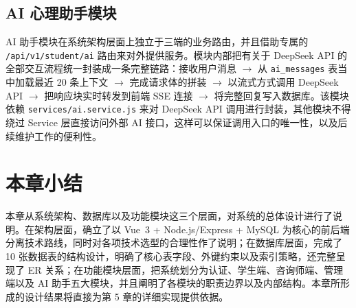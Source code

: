 \subsection{AI 心理助手模块}

{\sloppy
AI 助手模块在系统架构层面上独立于三端的业务路由，并且借助专属的 \texttt{/api/v1/student/ai} 路由来对外提供服务。模块内部把有关于 DeepSeek API 的全部交互流程统一封装成一条完整链路：接收用户消息 $\rightarrow$ 从 \texttt{ai\_messages} 表当中加载最近 20 条上下文 $\rightarrow$ 完成请求体的拼装 $\rightarrow$ 以流式方式调用 DeepSeek API $\rightarrow$ 把响应块实时转发到前端 SSE 连接 $\rightarrow$ 将完整回复写入数据库。该模块依赖 \texttt{services/ai.service.js} 来对 DeepSeek API 调用进行封装，其他模块不得绕过 Service 层直接访问外部 AI 接口，这样可以保证调用入口的唯一性，以及后续维护工作的便利性\cite{deepseek2024}。
}


\section*{本章小结}

本章从系统架构、数据库以及功能模块这三个层面，对系统的总体设计进行了说明。在架构层面，确立了以 Vue~3 + Node.js/Express + MySQL 为核心的前后端分离技术路线，同时对各项技术选型的合理性作了说明；在数据库层面，完成了 10 张数据表的结构设计，明确了核心表字段、外键约束以及索引策略，还完整呈现了 ER 关系；在功能模块层面，把系统划分为认证、学生端、咨询师端、管理端以及 AI 助手五大模块，并且阐明了各模块的职责边界以及内部结构。本章所形成的设计结果将直接为第 5 章的详细实现提供依据。
